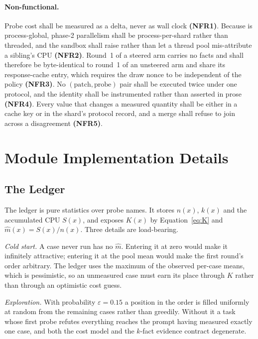 \paragraph{Non-functional.} Probe cost shall be measured as a
 delta, never as wall clock \textbf{(NFR1)}.
Because  is process-global, phase-2 parallelism shall be
process-per-shard rather than threaded, and the sandbox shall raise rather than
let a thread pool mis-attribute a sibling's CPU \textbf{(NFR2)}. Round~1 of a
steered arm carries no facts and shall therefore be byte-identical to round~1
of an unsteered arm and share its response-cache entry, which requires the draw
nonce to be independent of the policy \textbf{(NFR3)}. No $(\text{patch},
\text{probe})$ pair shall be executed twice under one protocol, and the
identity shall be instrumented rather than asserted in prose \textbf{(NFR4)}.
Every value that changes a measured quantity shall be either in a cache key or
in the shard's protocol record, and a merge shall refuse to join across a
disagreement \textbf{(NFR5)}.

\section{Module Implementation Details}

\subsection{The Ledger}
\label{sec:ledger}

The ledger is pure statistics over probe names. It stores $n(x)$, $k(x)$ and
the accumulated CPU $S(x)$, and exposes $K(x)$ by Equation~\eqref{eq:K} and
$\hat m(x) = S(x)/n(x)$. Three details are load-bearing.

\emph{Cold start.} A case never run has no $\hat m$. Entering it at zero would
make it infinitely attractive; entering it at the pool mean would make the
first round's order arbitrary. The ledger uses the maximum of the observed
per-case means, which is pessimistic, so an unmeasured case must earn its place
through $K$ rather than through an optimistic cost guess.

\emph{Exploration.} With probability $\varepsilon = 0.15$ a position in the
order is filled uniformly at random from the remaining cases rather than
greedily. Without it a task whose first probe refutes everything reaches the
prompt having measured exactly one case, and both the cost model and the
$k$-fact evidence contract degenerate.

